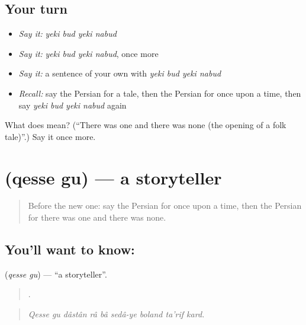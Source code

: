 \subsection*{Your turn}
\begin{itemize}
\raggedright
  \item \emph{Say it:} \emph{yeki bud yeki nabud}
  \item \emph{Say it:} \emph{yeki bud yeki nabud}, once more
  \item \emph{Say it:} a sentence of your own with \emph{yeki bud yeki nabud}
  \item \emph{Recall:} say the Persian for a tale, then the Persian for once upon a time, then say \emph{yeki bud yeki nabud} again
\end{itemize}

\begin{tcolorbox}[breakable,colback=teal!4,colframe=teal!35!black,title={Before you move on}]
What does     mean? (\textquotedblleft{}There was one and there was none (the opening of a folk tale)\textquotedblright{}.) Say it once more.
\end{tcolorbox}
\section[\texorpdfstring{\fa{قصه} \fa{گو} (qesse gu)}{قصه گو (qesse gu)}]{  (qesse gu) — a storyteller}

\label{lesson:FA-C345-qesse-gu}



\begin{quote}
Before the new one: say the Persian for once upon a time, then the Persian for there was one and there was none.
\end{quote}

\subsection*{You'll want to know:  }
\textbf{ } (\emph{qesse gu}) — \textquotedblleft{}a storyteller\textquotedblright{}.

\begin{quote}
        .
\end{quote}

\begin{quote}
\emph{Qesse gu dâstân râ bâ sedâ-ye boland ta'rif kard.}
\end{quote}


